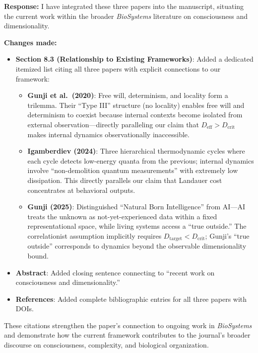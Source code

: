 \documentclass[11pt]{article}
\newcommand{\response}{\textcolor{responsecolor}{\textbf{Response: }}}
\begin{document}
\response I have integrated these three papers into the manuscript, situating the current work within the broader \textit{BioSystems} literature on consciousness and dimensionality.

\textbf{Changes made:}
\begin{itemize}
\item \textbf{Section 8.3 (Relationship to Existing Frameworks)}: Added a dedicated itemized list citing all three papers with explicit connections to our framework:

\begin{itemize}
\item \textbf{Gunji et al.\ (2020)}: Free will, determinism, and locality form a trilemma. Their ``Type III'' structure (no locality) enables free will and determinism to coexist because internal contexts become isolated from external observation---directly paralleling our claim that $D_{\text{eff}} > D_{\text{crit}}$ makes internal dynamics observationally inaccessible.

\item \textbf{Igamberdiev (2024)}: Three hierarchical thermodynamic cycles where each cycle detects low-energy quanta from the previous; internal dynamics involve ``non-demolition quantum measurements'' with extremely low dissipation. This directly parallels our claim that Landauer cost concentrates at behavioral outputs.

\item \textbf{Gunji (2025)}: Distinguished ``Natural Born Intelligence'' from AI---AI treats the unknown as not-yet-experienced data within a fixed representational space, while living systems access a ``true outside.'' The correlationist assumption implicitly requires $D_{\text{target}} < D_{\text{crit}}$; Gunji's ``true outside'' corresponds to dynamics beyond the observable dimensionality bound.
\end{itemize}

\item \textbf{Abstract}: Added closing sentence connecting to ``recent work on consciousness and dimensionality.''

\item \textbf{References}: Added complete bibliographic entries for all three papers with DOIs.
\end{itemize}

These citations strengthen the paper's connection to ongoing work in \textit{BioSystems} and demonstrate how the current framework contributes to the journal's broader discourse on consciousness, complexity, and biological organization.
\end{document}
